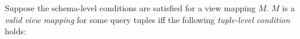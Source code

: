 \begin{definition}
\begin{enumerate}
\begin{enumerate}




\end{enumerate}
\end{enumerate}
\end{definition}

Suppose the schema-level conditions are satisfied for a view mapping $M$. $M$ is a {\em valid view mapping} for some query tuples iff the following {\em tuple-level condition} holds:

